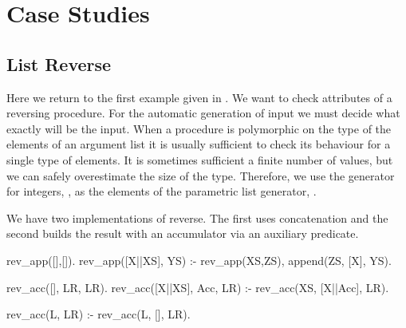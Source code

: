 
\section{Case Studies}
\label{sec:case-studies}




\subsection{List Reverse}

Here we return to the first example given in .
%
%
%
We want to check attributes of a reversing procedure.
%
For the automatic generation of input we must decide what
exactly  will be the input.
%
When a procedure is polymorphic on the type of the elements of an
argument list it is usually sufficient to check its behaviour for a
single type of elements.
%
It is sometimes sufficient a finite number of values, but we can
safely overestimate the size of the type.
%
%
Therefore, we use the generator for integers, , as the elements
of the parametric list generator, .


We have two implementations of reverse.
The first uses concatenation and the second
builds the result with an accumulator via an auxiliary predicate.
%
\begin{yapcode}
 rev_app([],[]).
 rev_app([X||XS], YS) :- rev_app(XS,ZS), append(ZS, [X], YS).

 rev_acc([], LR, LR).
 rev_acc([X||XS], Acc, LR) :- rev_acc(XS, [X||Acc], LR).

 rev_acc(L, LR) :- rev_acc(L, [], LR).
\end{yapcode}


